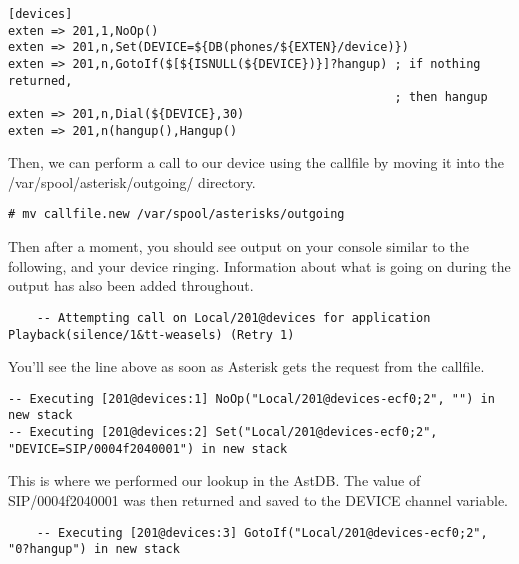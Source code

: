 \begin{astlisting}
\begin{verbatim}
[devices]
exten => 201,1,NoOp()
exten => 201,n,Set(DEVICE=${DB(phones/${EXTEN}/device)})
exten => 201,n,GotoIf($[${ISNULL(${DEVICE})}]?hangup) ; if nothing returned,
                                                      ; then hangup
exten => 201,n,Dial(${DEVICE},30)
exten => 201,n(hangup(),Hangup()
\end{verbatim}
\end{astlisting}

Then, we can perform a call to our device using the callfile by moving it into
the /var/spool/asterisk/outgoing/ directory.

\begin{verbatim}
# mv callfile.new /var/spool/asterisks/outgoing
\end{verbatim}

Then after a moment, you should see output on your console similar to the
following, and your device ringing. Information about what is going on during
the output has also been added throughout.

\begin{astlisting}
\begin{verbatim}
    -- Attempting call on Local/201@devices for application Playback(silence/1&tt-weasels) (Retry 1)
\end{verbatim}
\end{astlisting}

You'll see the line above as soon as Asterisk gets the request from the 
callfile.

\begin{astlisting}
\begin{verbatim}
-- Executing [201@devices:1] NoOp("Local/201@devices-ecf0;2", "") in new stack
-- Executing [201@devices:2] Set("Local/201@devices-ecf0;2", "DEVICE=SIP/0004f2040001") in new stack
\end{verbatim}
\end{astlisting}

This is where we performed our lookup in the AstDB. The value of 
SIP/0004f2040001 was then returned and saved to the DEVICE channel variable.

\begin{astlisting}
\begin{verbatim}
    -- Executing [201@devices:3] GotoIf("Local/201@devices-ecf0;2", "0?hangup") in new stack
\end{verbatim}
\end{astlisting}

